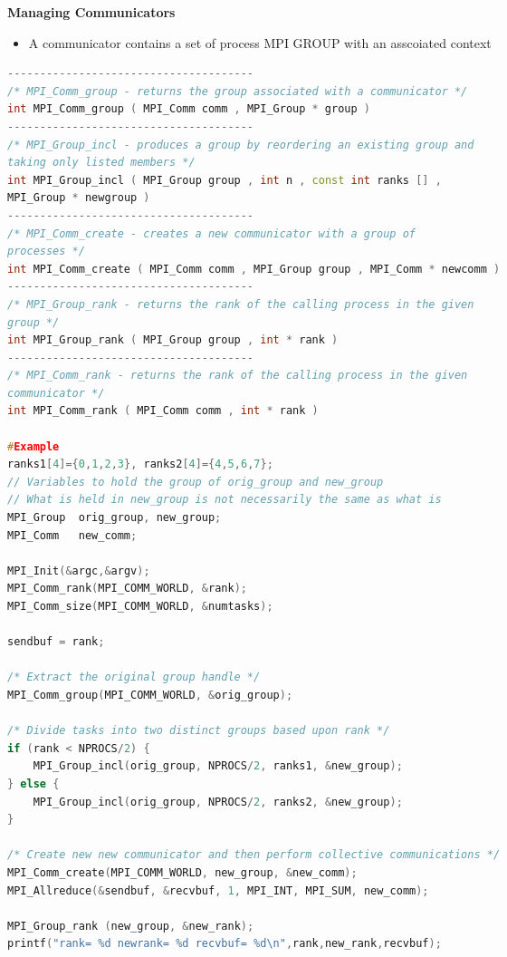\documentclass[10pt, landscape]{article}
\begin{document}
\begin{multicols}{4}
\textbf{Managing Communicators}
\begin{itemize}
    \item A communicator contains a set of process MPI GROUP with an asscoiated context 
\end{itemize}
\begin{lstlisting}[language=C++, breaklines=true, breakatwhitespace=true]
--------------------------------------
/* MPI_Comm_group - returns the group associated with a communicator */
int MPI_Comm_group ( MPI_Comm comm , MPI_Group * group )
--------------------------------------
/* MPI_Group_incl - produces a group by reordering an existing group and
taking only listed members */
int MPI_Group_incl ( MPI_Group group , int n , const int ranks [] ,
MPI_Group * newgroup )
--------------------------------------
/* MPI_Comm_create - creates a new communicator with a group of
processes */
int MPI_Comm_create ( MPI_Comm comm , MPI_Group group , MPI_Comm * newcomm )
--------------------------------------
/* MPI_Group_rank - returns the rank of the calling process in the given
group */
int MPI_Group_rank ( MPI_Group group , int * rank )
--------------------------------------
/* MPI_Comm_rank - returns the rank of the calling process in the given
communicator */
int MPI_Comm_rank ( MPI_Comm comm , int * rank )

#Example
ranks1[4]={0,1,2,3}, ranks2[4]={4,5,6,7};
// Variables to hold the group of orig_group and new_group
// What is held in new_group is not necessarily the same as what is 
MPI_Group  orig_group, new_group;
MPI_Comm   new_comm;

MPI_Init(&argc,&argv);
MPI_Comm_rank(MPI_COMM_WORLD, &rank);
MPI_Comm_size(MPI_COMM_WORLD, &numtasks);

sendbuf = rank;

/* Extract the original group handle */
MPI_Comm_group(MPI_COMM_WORLD, &orig_group);

/* Divide tasks into two distinct groups based upon rank */
if (rank < NPROCS/2) {
    MPI_Group_incl(orig_group, NPROCS/2, ranks1, &new_group);
} else {
    MPI_Group_incl(orig_group, NPROCS/2, ranks2, &new_group);
}

/* Create new new communicator and then perform collective communications */
MPI_Comm_create(MPI_COMM_WORLD, new_group, &new_comm);
MPI_Allreduce(&sendbuf, &recvbuf, 1, MPI_INT, MPI_SUM, new_comm);

MPI_Group_rank (new_group, &new_rank);
printf("rank= %d newrank= %d recvbuf= %d\n",rank,new_rank,recvbuf);


\end{lstlisting}
\end{multicols}
\end{document}
